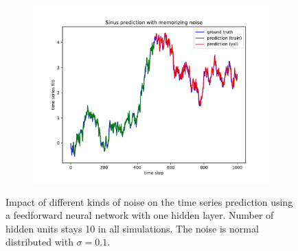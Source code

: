 \documentclass{article}
\begin{document}
\begin{figure}
\begin{subfigure}{.35\textwidth}
    \includegraphics[width=\linewidth]{figures/plot_twolayer_memnoise.pdf}
  \end{subfigure}
  \caption{Impact of different kinds of noise on the time series prediction
  using a feedforward neural network with one hidden layer. Number of hidden
  units stays 10 in all simulations. The noise is normal distributed with $\sigma = 
  0.1$.}
  \label{fig:noise_impact} 
\end{figure}
\end{document}
